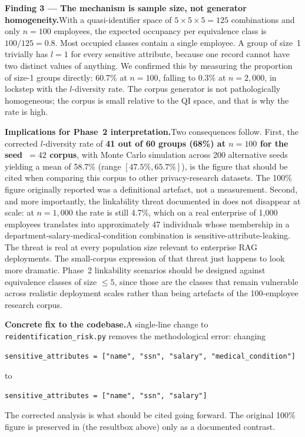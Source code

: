 \documentclass[12pt, a4paper]{report}
\begin{document}
\medskip
\noindent\textbf{Finding 3 --- The mechanism is sample size, not generator homogeneity.}\quad With a quasi-identifier space of $5 \times 5 \times 5 = 125$ combinations and only $n = 100$ employees, the expected occupancy per equivalence class is $100 / 125 = 0.8$. Most occupied classes contain a single employee. A group of size~1 trivially has $l = 1$ for every sensitive attribute, because one record cannot have two distinct values of anything. We confirmed this by measuring the proportion of size-1 groups directly: 60.7\% at $n = 100$, falling to 0.3\% at $n = 2{,}000$, in lockstep with the $l$-diversity rate. The corpus generator is not pathologically homogeneous; the corpus is small relative to the QI space, and that is why the rate is high.

\medskip
\noindent\textbf{Implications for Phase~2 interpretation.}\quad Two consequences follow. First, the corrected $l$-diversity rate of \textbf{41 out of 60 groups (68\%) at $n = 100$ for the seed~$=42$ corpus}, with Monte Carlo simulation across 200 alternative seeds yielding a mean of 58.7\% (range $[47.5\%, 65.7\%]$), is the figure that should be cited when comparing this corpus to other privacy-research datasets. The 100\% figure originally reported was a definitional artefact, not a measurement. Second, and more importantly, the linkability threat documented in  does not disappear at scale: at $n = 1{,}000$ the rate is still 4.7\%, which on a real enterprise of 1{,}000 employees translates into approximately 47 individuals whose membership in a department-salary-medical-condition combination is sensitive-attribute-leaking. The threat is real at every population size relevant to enterprise RAG deployments. The small-corpus expression of that threat just happens to look more dramatic. Phase~2 linkability scenarios should be designed against equivalence classes of size $\leq 5$, since those are the classes that remain vulnerable across realistic deployment scales rather than being artefacts of the 100-employee research corpus.

\medskip
\noindent\textbf{Concrete fix to the codebase.}\quad A single-line change to \texttt{reidentification\_risk.py} removes the methodological error: changing
\begin{lstlisting}[style=termstyle]
sensitive_attributes = ["name", "ssn", "salary", "medical_condition"]
\end{lstlisting}
to
\begin{lstlisting}[style=termstyle]
sensitive_attributes = ["name", "ssn", "salary"]
\end{lstlisting}
The corrected analysis is what should be cited going forward. The original 100\% figure is preserved in  (the resultbox above) only as a documented contrast.
\end{document}

